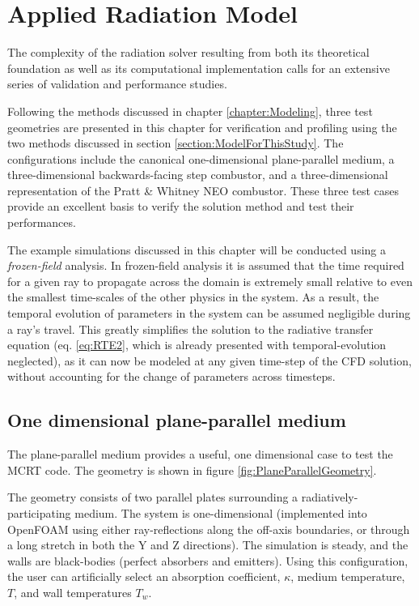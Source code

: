 \addchapheadtotoc
\chapter{Applied Radiation Model}\label{chapter:Example}
The complexity of the radiation solver resulting from both its theoretical foundation as well as its computational implementation calls for an extensive series of validation and performance studies.

Following the methods discussed in chapter \ref{chapter:Modeling}, three test geometries are presented in this chapter for verification and profiling using the two methods discussed in section \ref{section:ModelForThisStudy}. The configurations include the canonical one-dimensional plane-parallel medium, a three-dimensional backwards-facing step combustor, and a three-dimensional representation of the Pratt \& Whitney NEO combustor. 
These three test cases provide an excellent basis to verify the solution method and test their performances. 

The example simulations discussed in this chapter will be conducted using a \textit{frozen-field} analysis. In frozen-field analysis it is assumed that the time required for a given ray to propagate across the domain is extremely small relative to even the smallest time-scales of the other physics in the system. 
As a result, the temporal evolution of parameters in the system can be assumed negligible during a ray's travel.
This greatly simplifies the solution to the radiative transfer equation (eq. \ref{eq:RTE2}, which is already presented with temporal-evolution neglected), as it can now be modeled at any given time-step of the CFD solution, without accounting for the change of parameters across timesteps.

\section{One dimensional plane-parallel medium}
The plane-parallel medium provides a useful, one dimensional case to test the MCRT code. The geometry is shown in figure \ref{fig:PlaneParallelGeometry}.

The geometry consists of two parallel plates surrounding a radiatively-participating medium. The system is one-dimensional (implemented into OpenFOAM using either ray-reflections along the off-axis boundaries, or through a long stretch in both the Y and Z directions). The simulation is steady, and the walls are black-bodies (perfect absorbers and emitters).
Using this configuration, the user can artificially select an absorption coefficient, $\kappa{}$, medium temperature, $T$, and wall temperatures $T_w$.

